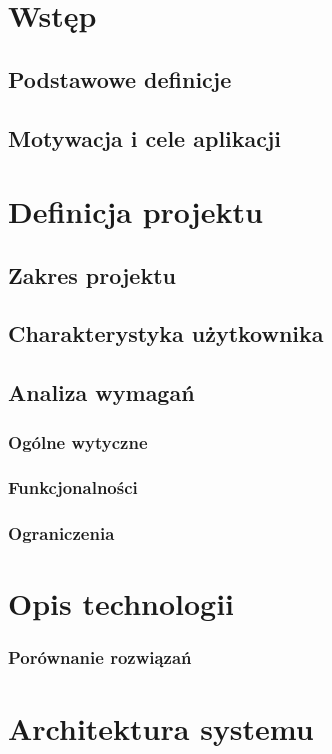 \documentclass[12pt, oneside]{report}
\theoremstyle{definition}
\begin{document}
\chapter{Wstęp}
\section{Podstawowe definicje}
\section{Motywacja i cele aplikacji}


\newpage
\chapter{Definicja projektu}
\section{Zakres projektu}
\section{Charakterystyka użytkownika}
\section{Analiza wymagań}
\subsection{Ogólne wytyczne}
\subsection{Funkcjonalności}
\subsection{Ograniczenia}


\newpage
\chapter{Opis technologii}
\subsection{Porównanie rozwiązań}

\chapter{Architektura systemu}
\end{document}
